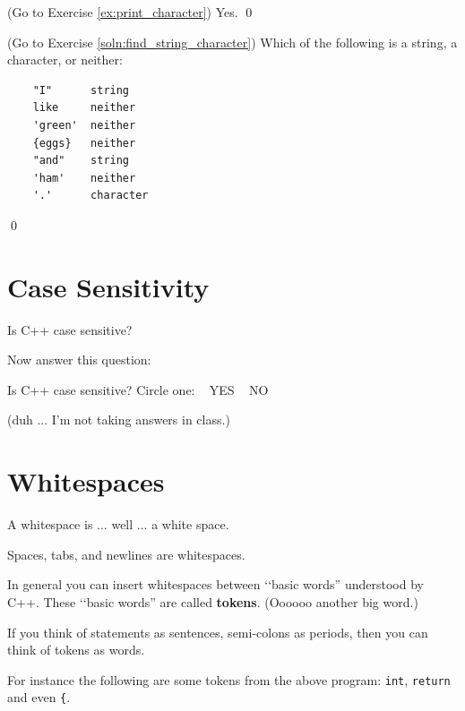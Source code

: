 \begin{soln} \label{soln:print_character}
(Go to Exercise \ref{ex:print_character})
Yes.
\qed
\end{soln}

\begin{soln} \label{ex:find_string_character}
(Go to Exercise \ref{soln:find_string_character})
Which of the following is a string, a character, or neither:
\begin{verbatim}
    "I"      string
    like     neither
    'green'  neither
    {eggs}   neither
    "and"    string
    'ham'    neither
    '.'      character
\end{verbatim}
\qed
\end{soln}



\newpage\section{Case Sensitivity}

Is C++ case sensitive?




Now answer this question:

Is C++ case sensitive? Circle one: \,\,\, YES  \,\,\, NO

(duh ... I'm not taking answers in class.)






\newpage\section{Whitespaces}

A whitespace is ... well ... a white space.

Spaces, tabs, and newlines are whitespaces.






In general you can insert whitespaces between 
\lq\lq basic words'' understood by C++. 
These \lq\lq basic words'' are called \textbf{tokens}. 
(Oooooo another big word.)

If you think of statements as sentences, 
semi-colons as periods, then you can think of tokens as words.


For instance the following are some tokens from the above program: 
\texttt{int}, \texttt{return} and even \texttt{\{}.

